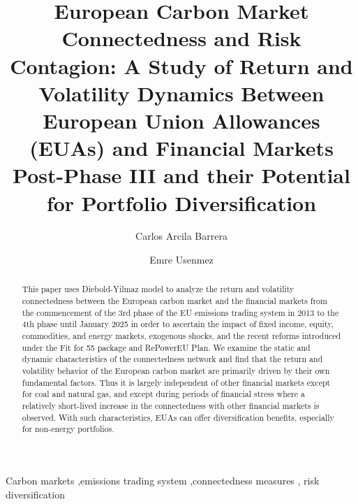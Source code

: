 \documentclass[preprint, 3p,
authoryear]{elsarticle} %
\begin{document}
\begin{frontmatter}

  \title{European Carbon Market Connectedness and Risk Contagion: A
Study of Return and Volatility Dynamics Between European Union
Allowances (EUAs) and Financial Markets Post-Phase III and their
Potential for Portfolio Diversification}
    \author[CISL,Sigma]{Carlos Arcila Barrera%
  }
    \author[Caius]{Emre Usenmez%
  }
  
  \begin{abstract}
  This paper uses Diebold-Yilmaz model to analyze the return and
  volatility connectedness between the European carbon market and the
  financial markets from the commencement of the 3rd phase of the EU
  emissions trading system in 2013 to the 4th phase until January 2025
  in order to ascertain the impact of fixed income, equity, commodities,
  and energy markets, exogenous shocks, and the recent reforms
  introduced under the Fit for 55 package and RePowerEU Plan. We examine
  the static and dynamic characteristics of the connectedness network
  and find that the return and volatility behavior of the European
  carbon market are primarily driven by their own fundamental factors.
  Thus it is largely independent of other financial markets except for
  coal and natural gas, and except during periods of financial stress
  where a relatively short-lived increase in the connectedness with
  other financial markets is observed. With such characteristics, EUAs
  can offer diversification benefits, especially for non-energy
  portfolios.
  \end{abstract}
    \begin{keyword}
    Carbon markets \sep emissions trading system \sep connectedness
measures \sep 
    risk diversification
  \end{keyword}
  
 \end{frontmatter}
\end{document}
